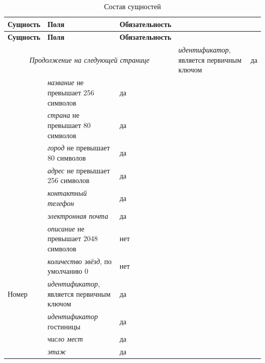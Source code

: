 \begin{longtable}{| p{3cm} | p{9.3cm} | p{3.6cm} |}
	\caption{Состав сущностей}
	\label{tbl:db_reservation} \\
	\hline
	
	\textbf{Сущность} & \textbf{Поля} & \textbf{Обязательность} \\
	\hline
	\endfirsthead
	
	\hline
	\textbf{Сущность} & \textbf{Поля} & \textbf{Обязательность} \\
	\hline
	\endhead
	
	\hline
	\multicolumn{3}{c}{\textit{Продолжение на следующей странице}}
	\endfoot
	\hline
	\endlastfoot
	
	\multirow{1}{*}{Гостиница}
	& 
	\textit{идентификатор}, является первичным ключом
	& 
	да \\
	\cline{2-3}
	
	&
	\textit{название} не превышает 256 символов
	&
	да \\
	\cline{2-3}
	
	&
	\textit{страна} не превышает 80 символов
	&
	да \\
	\cline{2-3}
	
	&
	\textit{город} не превышает 80 символов
	&
	да \\
	\cline{2-3}
	
	&
	\textit{адрес} не превышает 256 символов
	&
	да \\
	\cline{2-3}
	
	&
	\textit{контактный телефон}
	&
	да \\
	\cline{2-3}
	
	&
	\textit{электронная почта}
	&
	да \\
	\cline{2-3}
	
	&
	\textit{описание} не превышает 2048 символов
	&
	нет \\
	\cline{2-3}
	
	&
	\textit{количество звёзд}, по умолчанию 0
	&
	нет \\
	\hline
	
	\multirow{1}{*}{Номер}
	& 
	\textit{идентификатор}, является первичным ключом
	& 
	да \\
	\cline{2-3}
	
	&
	\textit{идентификатор} гостиницы
	&
	да \\
	\cline{2-3}
	
	&
	\textit{число мест}
	&
	да \\
	\cline{2-3}
	
	&
	\textit{этаж}
	&
	да \\
	\cline{2-3}
	

\end{longtable}
